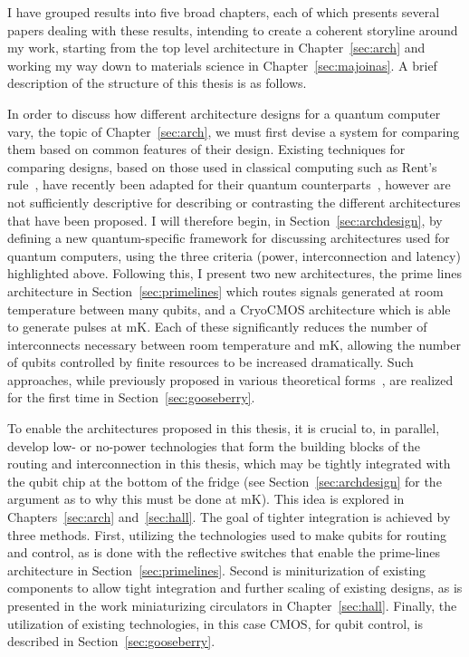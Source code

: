 I have grouped results into five broad chapters, each of which presents several papers dealing
with these results, intending to create a coherent storyline around my work, starting from the top
level architecture in Chapter~\ref{sec:arch} and working my way down to materials science in Chapter~\ref{sec:majoinas}.
A brief description of the structure of this thesis is as follows.

In order to discuss how different architecture designs for a quantum computer vary, the topic of Chapter~\ref{sec:arch},
we must first devise a system for comparing them
based on common features of their design. Existing techniques for comparing designs, based on those used in classical computing
such as Rent's rule~\cite{5388820}, have recently been adapted for their quantum counterparts~\cite{FRANKE20191}, however are
not sufficiently descriptive for describing or contrasting the different architectures that have been proposed. I will therefore begin, in
Section~\ref{sec:archdesign}, by defining a new quantum-specific framework for discussing architectures used for quantum computers,
using the three criteria (power, interconnection and latency) highlighted above. Following this, I present two new architectures,
the prime lines architecture in Section~\ref{sec:primelines} which routes signals generated at room temperature between many qubits,
and a CryoCMOS architecture which is able to generate pulses at mK. Each of these significantly reduces the number of interconnects necessary between
room temperature and mK, allowing the number of qubits controlled by finite resources to be increased dramatically. Such approaches,
while previously proposed in various theoretical forms~\cite{10.1038/npjqi.2015.11,s41467-017-01905-6}, are realized for the first
time in Section~\ref{sec:gooseberry}.

To enable the architectures proposed in this thesis, it is crucial to, in parallel, develop low- or no-power technologies that
form the building blocks of the routing and interconnection in this thesis, which may be tightly integrated with the qubit
chip at the bottom of the fridge (see Section~\ref{sec:archdesign} for the argument as to why this must be done at mK). This idea is explored
in Chapters~\ref{sec:arch} and~\ref{sec:hall}. The goal of tighter integration is achieved by three methods. First, utilizing the
technologies used to make qubits for routing and control, as is done with the reflective switches that enable the prime-lines
architecture in Section~\ref{sec:primelines}. Second is miniturization of existing components to allow tight integration and
further scaling of existing designs, as is presented in the work miniaturizing circulators in Chapter~\ref{sec:hall}. Finally,
the utilization of existing technologies, in this case CMOS, for qubit control, is described in Section~\ref{sec:gooseberry}.


